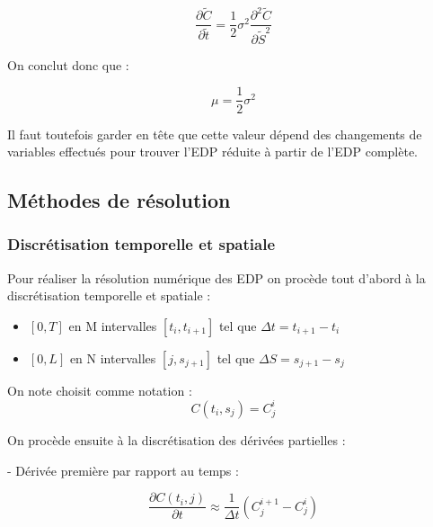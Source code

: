 \documentclass[11pt,a4paper]{article}
\begin{document}
$$\frac{\partial \widetilde{C}}{\partial \widetilde{t}} = \frac{1}{2} \sigma^2 \frac{\partial^{2} \widetilde{C}}{\partial \widetilde{S}^{2}}$$

\vspace{0.2cm}

On conclut donc que :

\begin{equation}
\boxed{\mu = \frac{1}{2} \sigma^2}
\end{equation}

\vspace{0.4cm}

Il faut toutefois garder en tête que cette valeur dépend des changements de variables effectués pour trouver l'EDP réduite à partir de l'EDP complète.

\newpage

\subsection{Méthodes de résolution}

\subsubsection{Discrétisation temporelle et spatiale}

Pour réaliser la résolution numérique des EDP on procède tout d'abord à la discrétisation temporelle et spatiale :

\vspace{0.2cm}

\begin{itemize}
    \item $[0,T]$ en M intervalles $[t_{i},t_{i+1}]$ tel que $\Delta t = t_{i+1} - t_{i}$\vspace{0.1cm}
    \item $[0,L]$ en N intervalles $[j,s_{j+1}]$ tel que $\Delta S = s_{j+1} - s_j$
\end{itemize}

\vspace{0.2cm}

\noindent
On note choisit comme notation : $$C(t_i,s_j) = C_j^i$$

\noindent
On procède ensuite à la discrétisation des dérivées partielles  :

\vspace{0.2cm}

- Dérivée première par rapport au temps :

\begin{equation}
\boxed{\frac{\partial C(t_{i},j)}{\partial t} \approx \frac{1}{\Delta t} (C_{j}^{i+1} - C_{j}^{i})}
\end{equation}
\end{document}
